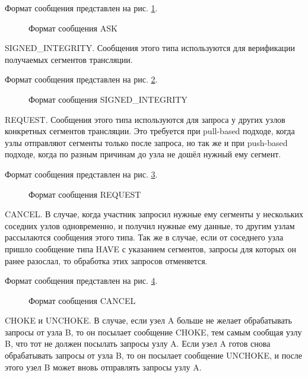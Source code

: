 		Формат сообщения представлен на рис. \ref{img:ppspp-message-ask}.
		\begin{figure}[h]
			\caption{Формат сообщения ASK}
			\label{img:ppspp-message-ask}
		\end{figure}


		SIGNED\_INTEGRITY. Сообщения этого типа используются для верификации получаемых сегментов трансляции.

		Формат сообщения представлен на рис. \ref{img:ppspp-message-signed-integrity}.
		\begin{figure}[h]
			\caption{Формат сообщения SIGNED\_INTEGRITY}
			\label{img:ppspp-message-signed-integrity}
		\end{figure}

   		REQUEST. Сообщения этого типа используются для запроса у других узлов конкретных сегментов трансляции.
   		Это требуется при pull-based подходе, когда узлы отправляют сегменты только после запроса, но так же и при
   		push-based подходе, когда по разным причинам до узла не дошёл нужный ему сегмент.

   		Формат сообщения представлен на рис. \ref{img:ppspp-message-request}.
		\begin{figure}[h]
			\caption{Формат сообщения REQUEST}
			\label{img:ppspp-message-request}
		\end{figure}

   		CANCEL. В случае, когда участник запросил нужные ему сегменты у нескольких соседних узлов одновременно,
   		и получил нужные ему данные, то другим узлам рассылаются сообщения этого типа. Так же в случае, если от
   		соседнего узла пришло сообщение типа HAVE с указанием сегментов, запросы для которых он ранее разослал, то
   		обработка этих запросов отменяется.

   		Формат сообщения представлен на рис. \ref{img:ppspp-message-cancel}.
		\begin{figure}[h]
			\caption{Формат сообщения CANCEL}
			\label{img:ppspp-message-cancel}
		\end{figure}


   		CHOKE и UNCHOKE. В случае, если узел A больше не желает обрабатывать запросы от узла B, то он
   		посылает сообщение CHOKE, тем самым сообщая узлу B, что тот не должен посылать запросы узлу A. Если узел A готов
   		снова обрабатывать запросы от узла B, то он посылает сообщение UNCHOKE, и после этого узел B может вновь
   		отправлять запросы узлу A.

